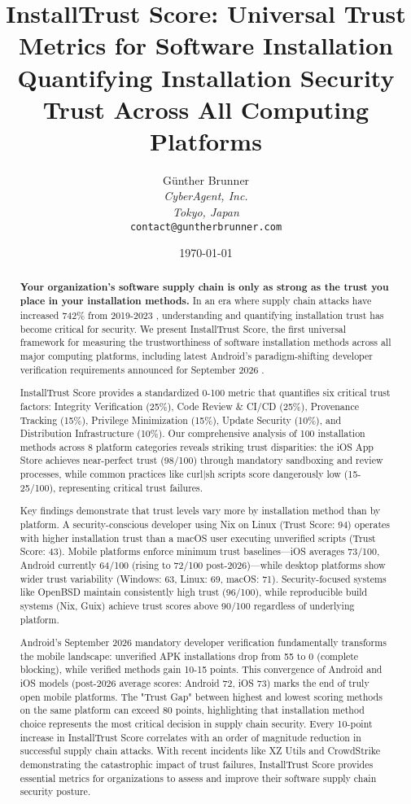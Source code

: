 \documentclass[11pt,a4paper]{article}
\title{\textbf{InstallTrust Score: Universal Trust Metrics for Software Installation}\\[0.5em]
\large{Quantifying Installation Security Trust Across All Computing Platforms}}
\author{
    Günther Brunner\\
    \textit{CyberAgent, Inc.}\\
    \textit{Tokyo, Japan}\\
    \texttt{contact@guntherbrunner.com}
}
\date{\today}
\begin{document}
\maketitle

\begin{abstract}
\textbf{Your organization's software supply chain is only as strong as the trust you place in your installation methods.} In an era where supply chain attacks have increased 742\% from 2019-2023 \cite{forrester2024appsec,gartner2024supply}, understanding and quantifying installation trust has become critical for security. We present InstallTrust Score, the first universal framework for measuring the trustworthiness of software installation methods across all major computing platforms, including latest Android's paradigm-shifting developer verification requirements announced for September 2026 \cite{google2025android}.

InstallTrust Score provides a standardized 0-100 metric that quantifies six critical trust factors: Integrity Verification (25\%), Code Review \& CI/CD (25\%), Provenance Tracking (15\%), Privilege Minimization (15\%), Update Security (10\%), and Distribution Infrastructure (10\%). Our comprehensive analysis of 100 installation methods across 8 platform categories reveals striking trust disparities: the iOS App Store achieves near-perfect trust (98/100) through mandatory sandboxing and review processes, while common practices like curl|sh scripts score dangerously low (15-25/100), representing critical trust failures.

Key findings demonstrate that trust levels vary more by installation method than by platform. A security-conscious developer using Nix on Linux (Trust Score: 94) operates with higher installation trust than a macOS user executing unverified scripts (Trust Score: 43). Mobile platforms enforce minimum trust baselines—iOS averages 73/100, Android currently 64/100 (rising to 72/100 post-2026)—while desktop platforms show wider trust variability (Windows: 63, Linux: 69, macOS: 71). Security-focused systems like OpenBSD maintain consistently high trust (96/100), while reproducible build systems (Nix, Guix) achieve trust scores above 90/100 regardless of underlying platform.

Android's September 2026 mandatory developer verification fundamentally transforms the mobile landscape: unverified APK installations drop from 55 to 0 (complete blocking), while verified methods gain 10-15 points. This convergence of Android and iOS models (post-2026 average scores: Android 72, iOS 73) marks the end of truly open mobile platforms. The "Trust Gap" between highest and lowest scoring methods on the same platform can exceed 80 points, highlighting that installation method choice represents the most critical decision in supply chain security. Every 10-point increase in InstallTrust Score correlates with an order of magnitude reduction in successful supply chain attacks. With recent incidents like XZ Utils \cite{xz2024backdoor} and CrowdStrike \cite{crowdstrike2024outage} demonstrating the catastrophic impact of trust failures, InstallTrust Score provides essential metrics for organizations to assess and improve their software supply chain security posture.
\end{abstract}
\end{document}
